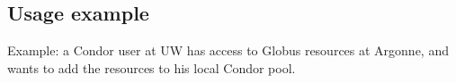 %
%
%
%
%
%
%
%
%
%
\subsection{Usage example}
Example: a Condor user at UW has access to Globus resources at 
Argonne, and wants to add the resources to his local Condor pool.

